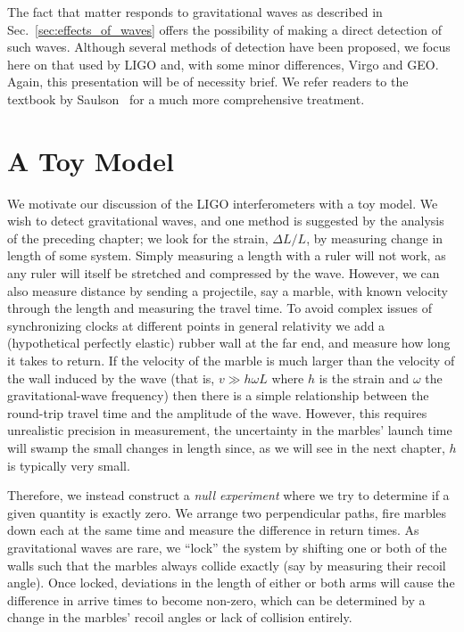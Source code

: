 The fact that matter responds to gravitational waves as described in
Sec.~\ref{sec:effects_of_waves} offers the possibility of making a
direct detection of such waves.  Although several methods of detection
have been proposed, we focus here on that used by LIGO and, with some
minor differences, Virgo and GEO.  Again, this presentation will be of
necessity brief.  We refer readers to the textbook by
Saulson~\cite{Saulson:1994} for a much more comprehensive treatment.

\section{A Toy Model}

We motivate our discussion of the LIGO interferometers with a toy
model.  We wish to detect gravitational waves, and one method is
suggested by the analysis of the preceding chapter; we look for the
strain, $\Delta L/L$, by measuring change in length of some system.
Simply measuring a length with a ruler will not work, as any ruler
will itself be stretched and compressed by the wave.  However, we can
also measure distance by sending a projectile, say a marble, with
known velocity through the length and measuring the travel time.  To
avoid complex issues of synchronizing clocks at different points in
general relativity we add a (hypothetical perfectly elastic) rubber
wall at the far end, and measure how long it takes to return.  If the
velocity of the marble is much larger than the velocity of the wall
induced by the wave (that is, $v \gg h \omega L$ where $h$ is the
strain and $\omega$ the gravitational-wave frequency) then there is a
simple relationship between the round-trip travel time and the
amplitude of the wave.  However, this requires unrealistic precision
in measurement, the uncertainty in the marbles' launch time will swamp
the small changes in length since, as we will see in the next chapter,
$h$ is typically very small.

Therefore, we instead construct a \emph{null experiment} where we try
to determine if a given quantity is exactly zero.  We arrange two
perpendicular paths, fire marbles down each at the same time and
measure the difference in return times.  As gravitational waves are
rare, we ``lock'' the system by shifting one or both of the walls such
that the marbles always collide exactly (say by measuring their recoil
angle).  Once locked, deviations in the length of either or both arms
will cause the difference in arrive times to become non-zero, which
can be determined by a change in the marbles' recoil angles or lack of
collision entirely.

